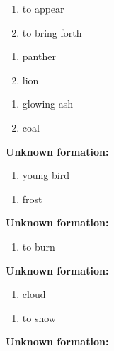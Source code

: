 \begin{enumerate}
\item to appear
\item to bring forth
\end{enumerate}
\begin{enumerate}
\item panther
\item lion
\end{enumerate}
\begin{enumerate}
\item glowing ash
\item coal
\end{enumerate}
\noindent\textbf{Unknown formation:}\\

\begin{enumerate}
\item young bird
\end{enumerate}
\begin{enumerate}
\item frost
\end{enumerate}
\noindent\textbf{Unknown formation:}\\

\begin{enumerate}
\item to burn
\end{enumerate}
\noindent\textbf{Unknown formation:}\\

\begin{enumerate}
\item cloud
\end{enumerate}
\begin{enumerate}
\item to snow
\end{enumerate}
\noindent\textbf{Unknown formation:}\\

